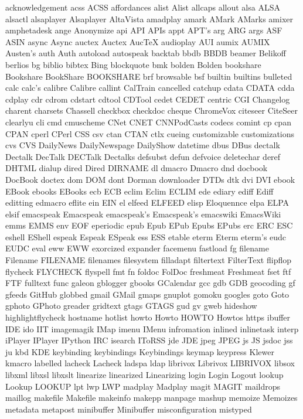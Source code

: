 acknowledgement
acss
ACSS
affordances
alist
Alist
allcaps
allout
alsa
ALSA
alsactl
alsaplayer
Alsaplayer
AltaVista
amadplay
amark
AMark
AMarks
amixer
amphetadesk
ange
Anonymize
api
API
APIs
appt
APT's
arg
ARG
args
ASF
ASIN
async
Async
auctex
Auctex
AucTeX
audioplay
AUI
aumix
AUMIX
Austen's
auth
Auth
autoload
autospeak
backtab
bbdb
BBDB
beamer
Belikoff
berlios
bg
biblio
bibtex
Bing
blockquote
bmk
bolden
Bolden
bookshare
Bookshare
BookShare
BOOKSHARE
brf
browsable
bsf
builtin
builtins
bulleted
calc
calc's
calibre
Calibre
callint
CalTrain
cancelled
catchup
cdata
CDATA
cdda
cdplay
cdr
cdrom
cdstart
cdtool
CDTool
cedet
CEDET
centric
CGI
Changelog
charent
charsets
Chassell
checkbox
checkdoc
cheque
ChromeVox
citeseer
CiteSeer
clearlyu
cli
cmd
cmuscheme
CNet
CNET
CNNPodCasts
codecs
comint
cp
cpan
CPAN
cperl
CPerl
CSS
csv
ctan
CTAN
ctlx
cueing
customizable
customizations
cvs
CVS
DailyNews
DailyNewspage
DailyShow
datetime
dbus
DBus
dectalk
Dectalk
DecTalk
DECTalk
Dectalks
defsubst
defun
defvoice
deletechar
deref
DHTML
dialup
dired
Dired
DIRNAME
dl
dmacro
Dmacro
dnd
docbook
DocBook
doctex
dom
DOM
dont
Dorman
downloader
DTDs
dtk
dvi
DVI
ebook
EBook
ebooks
EBooks
ecb
ECB
eclim
Eclim
ECLIM
ede
ediary
ediff
Ediff
editting
edmacro
eflite
ein
EIN
el
elfeed
ELFEED
elisp
Eloquennce
elpa
ELPA
elsif
emacspeak
Emacspeak
emacspeak's
Emacspeak's
emacswiki
EmacsWiki
emms
EMMS
env
EOF
eperiodic
epub
Epub
EPub
Epubs
EPubs
erc
ERC
ESC
eshell
EShell
espeak
Espeak
ESpeak
ess
ESS
etable
eterm
Eterm
eterm's
eudc
EUDC
eval
eww
EWW
exorcized
expander
facemenu
fastload
fg
filename
Filename
FILENAME
filenames
filesystem
filladapt
filtertext
FilterText
flipflop
flycheck
FLYCHECK
flyspell
fmt
fn
foldoc
FolDoc
freshmeat
Freshmeat
fset
ftf
FTF
fulltext
func
galeon
gblogger
gbooks
GCalendar
gcc
gdb
GDB
geocoding
gf
gfeeds
GitHub
globbed
gmail
GMail
gmaps
gnuplot
gomoku
googles
goto
Goto
gphoto
GPhoto
greader
gridtext
gtags
GTAGS
gud
gv
gweb
hideshow
highlightflycheck
hostname
hotlist
howto
Howto
HOWTO
Howtos
https
ibuffer
IDE
ido
IIT
imagemagik
IMap
imenu
IMenu
infromation
inlined
inlinetask
interp
iPlayer
IPlayer
IPython
IRC
isearch
IToRSS
jde
JDE
jpeg
JPEG
js
JS
jsdoc
jss
ju
kbd
KDE
keybinding
keybindings
Keybindings
keymap
keypress
Klewer
kmacro
labelled
lacheck
Lacheck
ladspa
ldap
librivox
Librivox
LIBRIVOX
libsox
libxml
libxsl
libxslt
linearize
linearized
Linearizing
login
Login
Logout
lookup
Lookup
LOOKUP
lpt
lwp
LWP
madplay
Madplay
magit
MAGIT
maildrops
maillog
makefile
Makefile
makeinfo
makepp
manpage
mashup
memoize
Memoizes
metadata
metapost
minibuffer
Minibuffer
misconfiguration
mistyped
